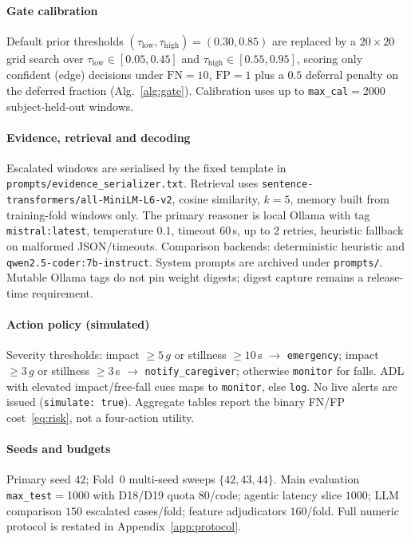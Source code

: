\documentclass[journal]{IEEEtran}
\begin{document}
\paragraph{Gate calibration}
Default prior thresholds $(\tau_{\mathrm{low}},\tau_{\mathrm{high}}){=}(0.30,0.85)$
are replaced by a $20{\times}20$ grid search over
$\tau_{\mathrm{low}}{\in}[0.05,0.45]$ and
$\tau_{\mathrm{high}}{\in}[0.55,0.95]$, scoring only confident (edge)
decisions under $\mathrm{FN}{=}10$, $\mathrm{FP}{=}1$ plus a $0.5$ deferral
penalty on the deferred fraction (Alg.~\ref{alg:gate}). Calibration uses up to
\texttt{max\_cal}${}={}$2000 subject-held-out windows.

\paragraph{Evidence, retrieval and decoding}
Escalated windows are serialised by the fixed template in
\texttt{prompts/evidence\_serializer.txt}. Retrieval uses
\texttt{sentence-transformers/all-MiniLM-L6-v2}, cosine similarity, $k{=}5$,
memory built from training-fold windows only. The primary reasoner is local
Ollama with tag \texttt{mistral:latest}, temperature $0.1$, timeout $60$\,s,
up to $2$ retries, heuristic fallback on malformed JSON/timeouts. Comparison
backends: deterministic heuristic and \texttt{qwen2.5-coder:7b-instruct}.
System prompts are archived under \texttt{prompts/}. Mutable Ollama tags do
not pin weight digests; digest capture remains a release-time requirement.

\paragraph{Action policy (simulated)}
Severity thresholds: impact $\ge 5\,g$ or stillness $\ge 10$\,s $\rightarrow$
\texttt{emergency}; impact $\ge 3\,g$ or stillness $\ge 3$\,s $\rightarrow$
\texttt{notify\_caregiver}; otherwise \texttt{monitor} for falls. ADL with
elevated impact/free-fall cues maps to \texttt{monitor}, else \texttt{log}.
No live alerts are issued (\texttt{simulate: true}). Aggregate tables report
the binary FN/FP cost~\eqref{eq:risk}, not a four-action utility.

\paragraph{Seeds and budgets}
Primary seed $42$; Fold~0 multi-seed sweeps $\{42,43,44\}$. Main evaluation
\texttt{max\_test}${}={}$1000 with D18/D19 quota $80$/code; agentic latency
slice $1000$; LLM comparison $150$ escalated cases/fold; feature adjudicators
$160$/fold. Full numeric protocol is restated in Appendix~\ref{app:protocol}.
\end{document}
